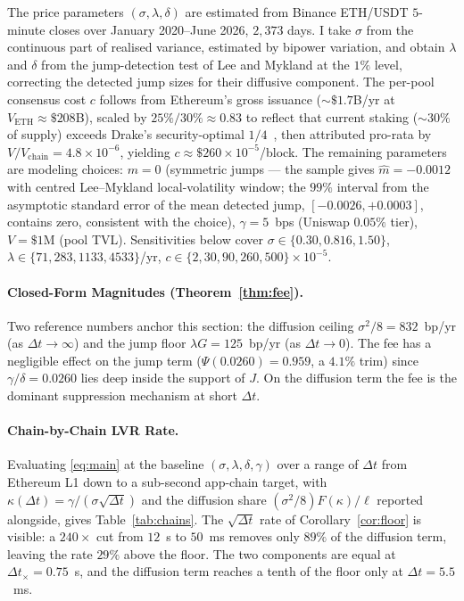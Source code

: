 \documentclass[runningheads]{llncs}
\newcommand{\dt}{\Delta t}
\newcommand{\1}{\mathbf{1}}
\begin{document}
The price parameters $(\sigma,\lambda,\delta)$ are estimated from Binance ETH/USDT $5$-minute closes over January 2020--June 2026, $2{,}373$ days. I take $\sigma$ from the continuous part of realised variance, estimated by bipower variation, and obtain $\lambda$ and $\delta$ from the jump-detection test of Lee and Mykland at the $1\%$ level, correcting the detected jump sizes for their diffusive component. The per-pool consensus cost $c$ follows from Ethereum's gross issuance ($\sim\!\$1.7$B/yr at $V_{\text{ETH}} \approx \$208$B), scaled by $25\%/30\% \approx 0.83$ to reflect that current staking ($\sim\!30\%$ of supply) exceeds Drake's security-optimal $1/4$~\cite{drake2025croissant,elowsson2024endgame}, then attributed pro-rata by $V/V_{\text{chain}} = 4.8 \times 10^{-6}$, yielding $c \approx \$260 \times 10^{-5}$/block. The remaining parameters are modeling choices: $m = 0$ (symmetric jumps --- the sample gives $\hat m = -0.0012$ with centred Lee--Mykland local-volatility window; the $99\%$ interval from the asymptotic standard error of the mean detected jump, $[-0.0026, +0.0003]$, contains zero, consistent with the choice), $\gamma = 5$~bps (Uniswap $0.05\%$ tier), $V = \$1$M (pool TVL). Sensitivities below cover $\sigma \in \{0.30, 0.816, 1.50\}$, $\lambda \in \{71, 283, 1133, 4533\}$/yr, $c \in \{2, 30, 90, 260, 500\} \times 10^{-5}$.

\paragraph{Closed-Form Magnitudes (Theorem~\ref{thm:fee}).}
Two reference numbers anchor this section: the diffusion ceiling $\sigma^2/8 = 832$~bp/yr (as $\dt \to \infty$) and the jump floor $\lambda G = 125$~bp/yr (as $\dt \to 0$). The fee has a negligible effect on the jump term ($\Psi(0.0260) = 0.959$, a $4.1\%$ trim) since $\gamma/\delta = 0.0260$ lies deep inside the support of $J$. On the diffusion term the fee is the dominant suppression mechanism at short $\dt$.

\paragraph{Chain-by-Chain LVR Rate.}
Evaluating \eqref{eq:main} at the baseline $(\sigma,\lambda,\delta,\gamma)$ over a range of $\dt$ from Ethereum L1 down to a sub-second app-chain target, with $\kappa(\dt) = \gamma/(\sigma\sqrt{\dt})$ and the diffusion share $(\sigma^2/8)F(\kappa)/\ell$ reported alongside, gives Table~\ref{tab:chains}. The $\sqrt{\dt}$ rate of Corollary~\ref{cor:floor} is visible: a $240\times$ cut from $12$~s to $50$~ms removes only $89\%$ of the diffusion term, leaving the rate $29\%$ above the floor. The two components are equal at $\dt_\times = 0.75$~s, and the diffusion term reaches a tenth of the floor only at $\dt = 5.5$~ms.
\end{document}
